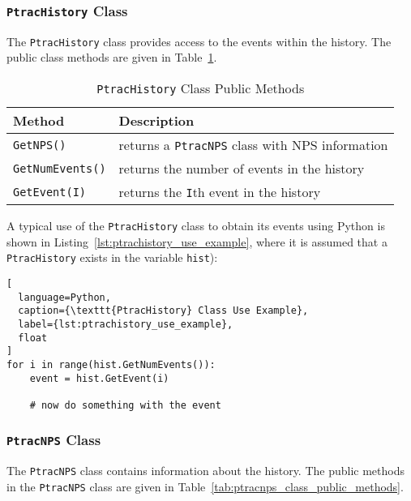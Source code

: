 \documentclass[11pt]{article}
\begin{document}
\subsubsection{\texttt{PtracHistory} Class}\label{the-ptrachistory-class}

The \texttt{PtracHistory} class provides access to the events within the
history. The public class methods are given in
Table~\ref{tab:ptrachistory_class_public_methods}.

\begin{table}[]
  \begin{center}
  \caption{\texttt{PtracHistory} Class Public Methods}
  \label{tab:ptrachistory_class_public_methods}
    \begin{tabular}{lp{4.0in}}
      \toprule
        Method & Description \\
      \midrule
        \texttt{GetNPS()}       & returns a \texttt{PtracNPS} class with NPS information \\
        \texttt{GetNumEvents()} & returns the number of events in the history \\
        \texttt{GetEvent(I)}    & returns the \texttt{I}th event in the history \\
      \bottomrule
    \end{tabular}
  \end{center}
\end{table}

A typical use of the \texttt{PtracHistory} class to obtain its events using
Python is shown in Listing~\ref{lst:ptrachistory_use_example}, where it is
assumed that a \texttt{PtracHistory} exists in the variable \texttt{hist}):

\begin{lstlisting}[
  language=Python,
  caption={\texttt{PtracHistory} Class Use Example},
  label={lst:ptrachistory_use_example},
  float
]
for i in range(hist.GetNumEvents()):
    event = hist.GetEvent(i)

    # now do something with the event
\end{lstlisting}

\subsubsection{\texttt{PtracNPS} Class}\label{the-ptracnps-class}

The \texttt{PtracNPS} class contains information about the history. The
public methods in the \texttt{PtracNPS} class are given in
Table~\ref{tab:ptracnps_class_public_methods}.
\end{document}
